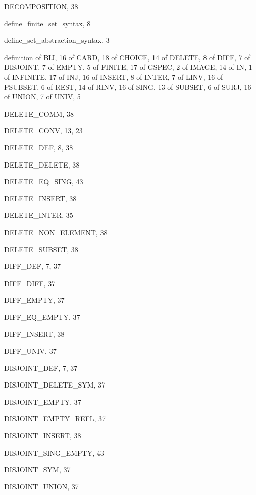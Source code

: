 \begin{theindex}
  \item {\ptt DECOMPOSITION}, 38
  \item {\ptt define\_finite\_set\_syntax}, 8
  \item {\ptt define\_set\_abstraction\_syntax}, 3
  \item definition
    \subitem of {\ptt BIJ}, 16
    \subitem of {\ptt CARD}, 18
    \subitem of {\ptt CHOICE}, 14
    \subitem of {\ptt DELETE}, 8
    \subitem of {\ptt DIFF}, 7
    \subitem of {\ptt DISJOINT}, 7
    \subitem of {\ptt EMPTY}, 5
    \subitem of {\ptt FINITE}, 17
    \subitem of {\ptt GSPEC}, 2
    \subitem of {\ptt IMAGE}, 14
    \subitem of {\ptt IN}, 1
    \subitem of {\ptt INFINITE}, 17
    \subitem of {\ptt INJ}, 16
    \subitem of {\ptt INSERT}, 8
    \subitem of {\ptt INTER}, 7
    \subitem of {\ptt LINV}, 16
    \subitem of {\ptt PSUBSET}, 6
    \subitem of {\ptt REST}, 14
    \subitem of {\ptt RINV}, 16
    \subitem of {\ptt SING}, 13
    \subitem of {\ptt SUBSET}, 6
    \subitem of {\ptt SURJ}, 16
    \subitem of {\ptt UNION}, 7
    \subitem of {\ptt UNIV}, 5
  \item {\ptt DELETE\_COMM}, 38
  \item {\ptt DELETE\_CONV}, 13, 23
  \item {\ptt DELETE\_DEF}, 8, 38
  \item {\ptt DELETE\_DELETE}, 38
  \item {\ptt DELETE\_EQ\_SING}, 43
  \item {\ptt DELETE\_INSERT}, 38
  \item {\ptt DELETE\_INTER}, 35
  \item {\ptt DELETE\_NON\_ELEMENT}, 38
  \item {\ptt DELETE\_SUBSET}, 38
  \item {\ptt DIFF\_DEF}, 7, 37
  \item {\ptt DIFF\_DIFF}, 37
  \item {\ptt DIFF\_EMPTY}, 37
  \item {\ptt DIFF\_EQ\_EMPTY}, 37
  \item {\ptt DIFF\_INSERT}, 38
  \item {\ptt DIFF\_UNIV}, 37
  \item {\ptt DISJOINT\_DEF}, 7, 37
  \item {\ptt DISJOINT\_DELETE\_SYM}, 37
  \item {\ptt DISJOINT\_EMPTY}, 37
  \item {\ptt DISJOINT\_EMPTY\_REFL}, 37
  \item {\ptt DISJOINT\_INSERT}, 38
  \item {\ptt DISJOINT\_SING\_EMPTY}, 43
  \item {\ptt DISJOINT\_SYM}, 37
  \item {\ptt DISJOINT\_UNION}, 37


\end{theindex}
